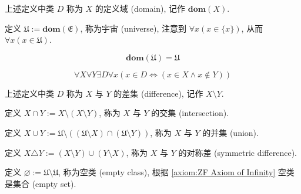 \begin{definition}
    \label {definition:domain}
    上述定义中类 \(D\) 称为 \(X\) 的定义域 (domain), 记作 \(\mathbf{dom} (X)\).
\end{definition}

\begin{definition}
    \label {definition:universe}
    定义 \(\mathfrak{U} := \mathbf{dom} (\mathfrak{E})\), 称为宇宙 (universe), 注意到 \(\forall x (x \in \{x\})\),
    从而 \(\forall x (x \in \mathfrak{U})\).
\end{definition}

\begin{corollary}
    \[
        \mathbf{dom} (\mathfrak{U}) = \mathfrak{U}
    \]
\end{corollary}

\begin{axiom*}
    \label {axiom:NBG Axiom of Difference}
    \[
        \forall X \forall Y \exists D \forall x (x \in D \Leftrightarrow (x \in X \land x \notin Y))
    \]
\end{axiom*}

\begin{definition}
    \label {definition:difference of two classes}
    上述定义中类 \(D\) 称为 \(X\) 与 \(Y\) 的差集 (difference), 记作 \(X \setminus Y\).
\end{definition}

\begin{definition}
    \label {definition:intersection of two classes}
    定义 \(X \cap Y := X \setminus (X \setminus Y)\), 称为 \(X\) 与 \(Y\) 的交集 (intersection).
\end{definition}

\begin{definition}
    \label {definition:union of two classes}
    定义 \(X \cup Y := \mathfrak{U} \setminus ((\mathfrak{U} \setminus X) \cap (\mathfrak{U} \setminus Y))\), 称为 \(X\) 与 \(Y\) 的并集 (union).
\end{definition}

\begin{definition}
    \label {definition:symmetric difference of two classes}
    定义 \(X \triangle Y := (X \setminus Y) \cup (Y \setminus X)\), 称为 \(X\) 与 \(Y\) 的对称差 (symmetric difference).
\end{definition}

\begin{definition}
    \label {definition:empty class}
    定义 \(\varnothing := \mathfrak{U} \setminus \mathfrak{U}\), 称为空类 (empty class), 根据 \ref{axiom:ZF Axiom of Infinity} 空类是集合 (empty set).
\end{definition}

